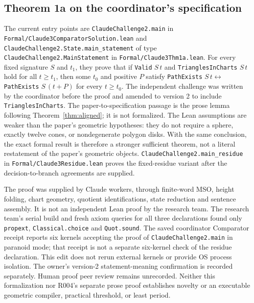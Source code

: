 \documentclass[11pt]{amsart}
\newcommand{\record}[1]{\nolinkurl{#1}}
\theoremstyle{definition}\newtheorem{definition}{Definition}
\begin{document}
\subsection{Theorem 1a on the coordinator's specification}
The current entry points are \record{ClaudeChallenge2.main} in
\record{Formal/Claude3ComparatorSolution.lean} and
\record{ClaudeChallenge2.State.main_statement} of type
\record{ClaudeChallenge2.MainStatement} in \record{Formal/Claude3Thm1a.lean}.
For every fixed signature $S$ and $t_1$, they prove that if
\record{Valid} $S\,t$ and \record{TrianglesInCharts} $S\,t$ hold for all
$t\ge t_1$, then some $t_0$ and positive $P$ satisfy
\record{PathExists} $S\,t\leftrightarrow$ \record{PathExists} $S\,(t+P)$
for every $t\ge t_0$. The independent challenge was written by the
coordinator before the proof and amended to version 2 to include
\record{TrianglesInCharts}. The paper-to-specification passage is the
prose lemma following Theorem~\ref{thm:aligned}; it is not formalized.
The Lean assumptions are weaker than the paper's geometric hypotheses:
they do not require a sphere, exactly twelve cones, or nondegenerate
polygon disks. With the same conclusion, the exact formal result is
therefore a stronger sufficient theorem, not a literal restatement
of the paper's geometric objects.
\record{ClaudeChallenge2.main_residue} in \record{Formal/Claude3Residue.lean}
proves the fixed-residue variant after the decision-to-branch agreements
are supplied.

The proof was supplied by Claude workers, through finite-word MSO,
height folding, chart geometry, quotient identifications, state
reduction and sentence assembly. It is not an independent Lean
proof by the research team. The research team's serial build and
fresh axiom queries for all three declarations found only
\record{propext}, \record{Classical.choice} and \record{Quot.sound}.
The saved coordinator Comparator receipt reports six kernels
accepting the proof of \record{ClaudeChallenge2.main} in paranoid mode;
that receipt is not a separate six-kernel check of the residue declaration.
This edit does not rerun external kernels or provide OS process isolation.
The owner's version-2 statement-meaning confirmation is recorded
separately. Human proof peer review remains unrecorded. Neither this formalization nor
R004's separate prose proof establishes novelty or an executable
geometric compiler, practical threshold, or least period.
\end{document}
